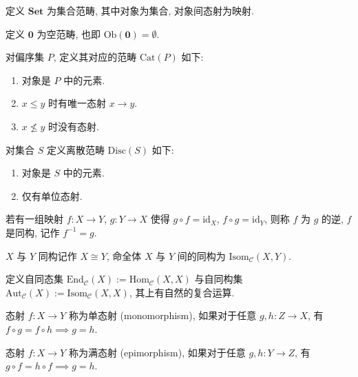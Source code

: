 \begin{example}
    定义 \(\mathbf{Set}\) 为集合范畴, 其中对象为集合, 对象间态射为映射.
\end{example}

\begin{example}
    定义 \(\mathbf{0}\) 为空范畴, 也即 \(\mathrm{Ob} (\mathbf{0}) = \emptyset\).
\end{example}

\begin{example}
    对偏序集 \(P\), 定义其对应的范畴 \(\mathrm{Cat} (P)\) 如下:

    \begin{enumerate}
        \item 对象是 \(P\) 中的元素.
        \item \(x \leq y\) 时有唯一态射 \(x \to y\).
        \item \(x \nleq y\) 时没有态射.
    \end{enumerate}
\end{example}

\begin{definition}
    对集合 \(S\) 定义离散范畴 \(\mathrm{Disc} (S)\) 如下:

    \begin{enumerate}
        \item 对象是 \(S\) 中的元素.
        \item 仅有单位态射.
    \end{enumerate}
\end{definition}

\begin{definition}
    若有一组映射 \(f : X \to Y\), \(g : Y \to X\) 使得 \(g \circ f = \mathrm{id}_X\), \(f \circ g = \mathrm{id}_Y\), 则称 \(f\) 为 \(g\) 的逆, \(f\) 是同构,
    记作 \(f^{-1} = g\).

    \(X\) 与 \(Y\) 同构记作 \(X \cong Y\), 命全体 \(X\) 与 \(Y\) 间的同构为 \(\mathrm{Isom}_{\mathcal{C}} (X,Y)\).
\end{definition}

\begin{definition}
    定义自同态集 \(\mathrm{End}_{\mathcal{C}} (X) := \mathrm{Hom}_{\mathcal{C}} (X,X)\) 与自同构集
    \(\mathrm{Aut}_{\mathcal{C}} (X) := \mathrm{Isom}_{\mathcal{C}} (X,X)\), 其上有自然的复合运算.
\end{definition}

\begin{definition}
    态射 \(f : X \to Y\) 称为单态射 (monomorphism), 如果对于任意 \(g,h : Z \to X\), 有 \(f \circ g = f \circ h \implies g = h\).

    态射 \(f : X \to Y\) 称为满态射 (epimorphism), 如果对于任意 \(g,h : Y \to Z\), 有 \(g \circ f = h \circ f \implies g = h\).
\end{definition}

